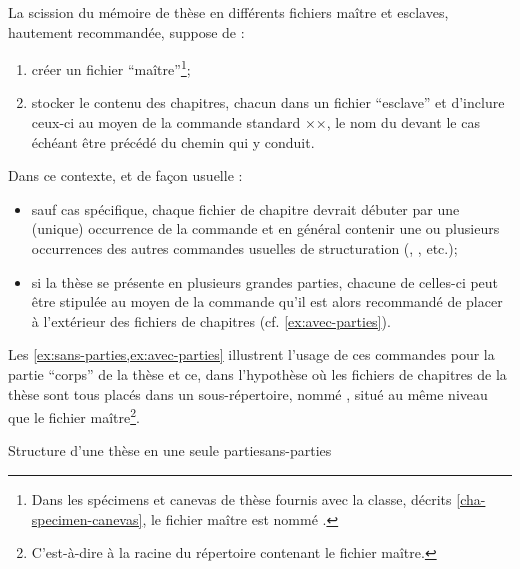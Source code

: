 La scission du mémoire de thèse en différents fichiers maître et esclaves,
hautement recommandée, suppose de :
\begin{enumerate}
\item créer un fichier \enquote{maître}\footnote{Dans les spécimens et canevas
    de thèse fournis avec la classe, décrits \vref{cha-specimen-canevas}, le
    fichier maître est nommé .};
\item stocker le contenu des chapitres, chacun dans un fichier
  \enquote{esclave}
  et d'inclure ceux-ci au moyen de la commande
  standard ××, le nom du  devant le cas échéant être précédé du chemin qui y
  conduit.
\end{enumerate}
%
Dans ce contexte, et de façon usuelle :
\begin{itemize}
\item sauf cas spécifique, chaque fichier de chapitre devrait débuter par une
  (unique) occurrence de la commande  et en général
  contenir une ou plusieurs occurrences des autres commandes usuelles de
  structuration (, , etc.);
\item si la thèse se présente en plusieurs grandes parties, chacune
  de celles-ci peut être stipulée au moyen de la commande
   qu'il est alors recommandé de placer à
  l'extérieur des fichiers de chapitres (cf.
  \vref{ex:avec-parties}).
\end{itemize}
%
Les \vref{ex:sans-parties,ex:avec-parties} illustrent l'usage de ces commandes
pour la partie \enquote{corps} de la thèse et ce, dans l'hypothèse où les
fichiers de chapitres de la thèse sont tous placés dans un sous-répertoire,
nommé , situé au même niveau que le fichier
maître\footnote{C'est-à-dire à la racine du répertoire contenant le fichier
  maître.}.
\begin{dbexample}{Structure d'une thèse en une seule partie}{sans-parties}
\begin{bodycode}
÷}
÷}
...
÷}
÷}
\end{bodycode}
\end{dbexample}
